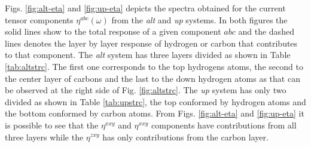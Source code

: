 \documentclass[pss]{wiley2sp} %
\begin{document}
Figs. \ref{fig:alt-eta} and \ref{fig:up-eta} depicts the spectra obtained for the current tensor components $\eta^{abc}(\omega)$ from the \emph{alt} and \emph{up} systems. In both figures the solid lines show to the total response of a given component $abc$ and the dashed lines denotes the layer by layer response of hydrogen or carbon that contributes to that component. The \emph{alt} system has three layers divided as shown in Table \ref{tab:altstrc}. The first one corresponds to the top hydrogens atoms, the second to the center layer of carbons and the last to the down hydrogen atoms as that can be observed at the right side of Fig. \ref{fig:altstrc}. The \emph{up} system has only two divided as shown in Table \ref{tab:upstrc}, the top conformed by hydrogen atoms and the bottom conformed by carbon atoms. From Figs. \ref{fig:alt-eta} and \ref{fig:up-eta} it is possible to see that the $\eta^{xxy}$ and $\eta^{xxy}$ components have contributions from all three layers while the $\eta^{zxy}$ has only contributions from the carbon layer.
\end{document}

